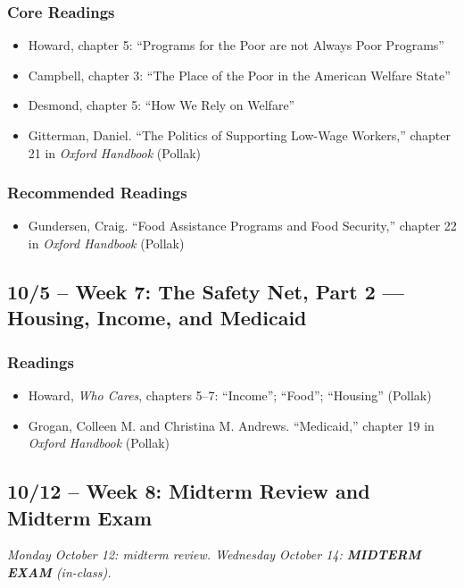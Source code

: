 \documentclass[12pt]{article}
\begin{document}
    \subsubsection*{Core Readings}
        \begin{itemize}
            \item Howard, chapter 5: ``Programs for the Poor are not Always Poor Programs''
            \item Campbell, chapter 3: ``The Place of the Poor in the American Welfare State''
            \item Desmond, chapter 5: ``How We Rely on Welfare''
            \item Gitterman, Daniel. ``The Politics of Supporting Low-Wage Workers,'' chapter 21 in \emph{Oxford Handbook} (Pollak)
        \end{itemize}
    \subsubsection*{Recommended Readings}
        \begin{itemize}
            \item Gundersen, Craig. ``Food Assistance Programs and Food Security,'' chapter 22 in \emph{Oxford Handbook} (Pollak)
        \end{itemize}

\subsection*{10/5 -- Week 7: The Safety Net, Part 2 --- Housing, Income, and Medicaid}
    \subsubsection*{Readings}
        \begin{itemize}
            \item Howard, \emph{Who Cares}, chapters 5--7: ``Income''; ``Food''; ``Housing'' (Pollak)
            \item Grogan, Colleen M. and Christina M. Andrews. ``Medicaid,'' chapter 19 in \emph{Oxford Handbook} (Pollak)
        \end{itemize}

\subsection*{10/12 -- Week 8: Midterm Review and Midterm Exam}
\emph{Monday October 12: midterm review. Wednesday October 14: \textbf{MIDTERM EXAM} (in-class).}
\end{document}
